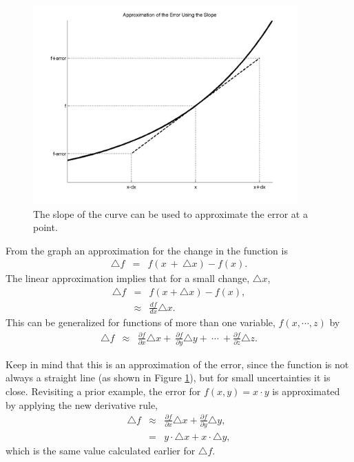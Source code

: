 \documentclass[12pt]{article}
\begin{document}
\begin{figure}[tb]
  \centerline{\includegraphics[height=3in]{slopeError}} %
  \caption{The slope of the curve can be used to approximate the error
  at a point.}
  \label{fig:slopeError}
\end{figure}

From the graph an approximation for the change in the function is
\begin{eqnarray*}
\triangle{f} & = & f(x~+~\triangle{x})-f(x).  
\end{eqnarray*}
The linear approximation implies that for a small change, $\triangle
x$, 
\begin{eqnarray}
\triangle{f} & = & f(x+\triangle {x})-f(x), \\
& \approx & \frac{df}{dx}\triangle{x}.
\end{eqnarray}
This can be generalized for functions of more than one variable,
$f(x,\cdots,z)$ by
\begin{eqnarray}
  \triangle{f} & \approx & 
  \frac{\partial f}{\partial x}\triangle{x}
  +~\frac{\partial f}{\partial y}\triangle{y}
  +~\cdots~+\frac{\partial f}{\partial z}\triangle{z}.
\end{eqnarray}
 
 
Keep in mind that this is an approximation of the error, since the
function is not always a straight line (as shown in Figure
\ref{fig:slopeError}), but for small uncertainties it is close.
Revisiting a prior example, the error for $f(x,y)=x\cdot y$ is
approximated by applying the new derivative rule,
\begin{eqnarray}
 \triangle{f} &\approx& \frac{\partial f}{\partial x}\triangle{x}
 +\frac{\partial f}{\partial y}\triangle{y}, \\
 &=& y \cdot \triangle{x}+x \cdot \triangle{y},
\end{eqnarray}
which is the same value calculated earlier for $\triangle{f}$.  
\end{document}
